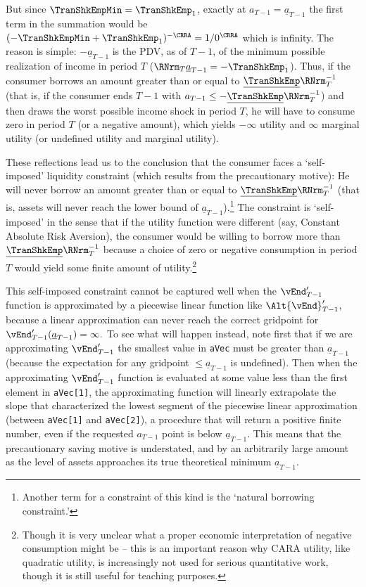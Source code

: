 \documentclass[titlepage, headings=optiontotocandhead]{\econtex}
\begin{document}
But since $\TranShkEmpMin=\TranShkEmp_{1}$, exactly at
${a}_{T-1}=\underline{a}_{T-1}$ the first term in the summation would
be $(-\TranShkEmpMin+\TranShkEmp_{1})^{-\CRRA}=1/0^{\CRRA}$ which is
infinity.  The reason is simple: $-\underline{a}_{T-1}$ is
the PDV, as of $T-1$, of the minimum possible realization of income in
period $T$ ($\RNrm_{T}\underline{a}_{T-1} = -\TranShkEmp_{1}$).  Thus,
if the consumer borrows an amount greater than or equal to
$\underline{\TranShkEmp}\RNrm_{T}^{-1}$ (that is, if the consumer ends
$T-1$ with ${a}_{T-1} \leq -\underline{\TranShkEmp}\RNrm_{T}^{-1}$) and
then draws the worst possible income shock in period $T$, he will have
to consume zero in period $T$ (or a negative amount), which yields
$-\infty$ utility and $\infty$ marginal utility (or undefined utility
and marginal utility).

These reflections lead us to the conclusion that the consumer faces a
`self-imposed' liquidity constraint (which results from the
precautionary motive): He will never borrow an amount greater
than or equal to $\underline{\TranShkEmp}\RNrm_{T}^{-1}$ (that is,
assets will never reach the lower bound of
$\underline{a}_{T-1}$).\footnote{Another term for a constraint of this
  kind is the `natural borrowing constraint.'}  The constraint is
`self-imposed' in the sense that if the utility function were
different (say, Constant Absolute Risk Aversion), the consumer would
be willing to borrow more than $\underline{\TranShkEmp}\RNrm_{T}^{-1}$
because a choice of zero or negative consumption in period $T$ would
yield some finite amount of utility.\footnote{Though it is very unclear what a
  proper economic interpretation of negative consumption might be --
  this is an important reason why CARA utility, like quadratic utility,
  is increasingly not used for serious quantitative work, though it is
  still useful for teaching purposes.}

This self-imposed constraint cannot be captured well when the
$\vEnd^{\prime}_{T-1}$ function is approximated by a piecewise
linear function like $\Alt{\vEnd}^{\prime}_{T-1}$, because a
linear approximation can never reach the correct gridpoint for
$\vEnd^{\prime}_{T-1}(\underline{a}_{T-1})=\infty.$ To see what
will happen instead, note first that if we are approximating $\vEnd^{\prime}_{T-1}$ the smallest value in
\texttt{aVec} must be greater than $\underline{a}_{T-1}$
(because the expectation for any gridpoint $\leq \underline{a}_{T-1}$ is undefined).  Then when the
approximating $\vEnd^{\prime}_{T-1}$ function is evaluated at
some value less than the first element in \texttt{aVec[1]}, the
approximating function will linearly extrapolate the slope that
characterized the lowest segment of the piecewise linear approximation
(between \texttt{aVec[1]} and \texttt{aVec[2]}), a
procedure that will return a positive finite number, even if the
requested ${a}_{T-1}$ point is below $\underline{a}_{T-1}$.  This means that the
precautionary saving motive is understated, and by an arbitrarily
large amount as the level of assets approaches its true theoretical
minimum $\underline{a}_{T-1}$.
\end{document}
